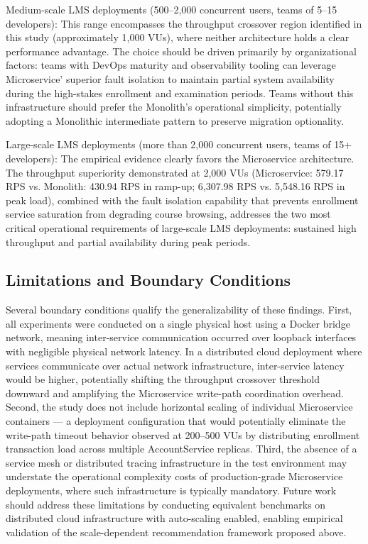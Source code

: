 Medium-scale LMS deployments (500–2,000 concurrent users, teams of 5–15 developers): This range encompasses the throughput crossover region identified in this study (approximately 1,000 VUs), where neither architecture holds a clear performance advantage. The choice should be driven primarily by organizational factors: teams with DevOps maturity and observability tooling can leverage Microservice' superior fault isolation to maintain partial system availability during the high-stakes enrollment and examination periods. Teams without this infrastructure should prefer the Monolith's operational simplicity, potentially adopting a Monolithic intermediate pattern to preserve migration optionality.

Large-scale LMS deployments (more than 2,000 concurrent users, teams of 15+ developers): The empirical evidence clearly favors the Microservice architecture. The throughput superiority demonstrated at 2,000 VUs (Microservice: 579.17 RPS vs. Monolith: 430.94 RPS in ramp-up; 6,307.98 RPS vs. 5,548.16 RPS in peak load), combined with the fault isolation capability that prevents enrollment service saturation from degrading course browsing, addresses the two most critical operational requirements of large-scale LMS deployments: sustained high throughput and partial availability during peak periods.

\subsection{Limitations and Boundary Conditions}

Several boundary conditions qualify the generalizability of these findings. First, all experiments were conducted on a single physical host using a Docker bridge network, meaning inter-service communication occurred over loopback interfaces with negligible physical network latency. In a distributed cloud deployment where services communicate over actual network infrastructure, inter-service latency would be higher, potentially shifting the throughput crossover threshold downward and amplifying the Microservice write-path coordination overhead. Second, the study does not include horizontal scaling of individual Microservice containers — a deployment configuration that would potentially eliminate the write-path timeout behavior observed at 200–500 VUs by distributing enrollment transaction load across multiple AccountService replicas. Third, the absence of a service mesh or distributed tracing infrastructure in the test environment may understate the operational complexity costs of production-grade Microservice deployments, where such infrastructure is typically mandatory. Future work should address these limitations by conducting equivalent benchmarks on distributed cloud infrastructure with auto-scaling enabled, enabling empirical validation of the scale-dependent recommendation framework proposed above.






